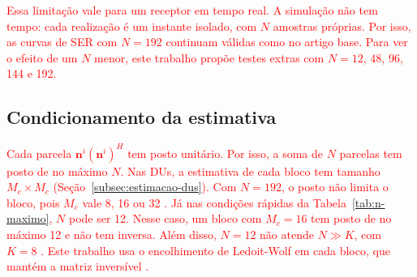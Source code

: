 \textcolor{red}{Essa limitação vale para um receptor em tempo real. A simulação não tem tempo: cada realização é um instante isolado, com $N$ amostras próprias. Por isso, as curvas de SER com $N = 192$ continuam válidas como no artigo base. Para ver o efeito de um $N$ menor, este trabalho propõe testes extras com $N = 12$, 48, 96, 144 e 192.}

\subsection{Condicionamento da estimativa}\label{subsec:condicionamento-R}

\textcolor{red}{Cada parcela $\mathbf{n}^i(\mathbf{n}^i)^H$ tem posto unitário. Por isso, a soma de $N$ parcelas tem posto de no máximo $N$. Nas DUs, a estimativa de cada bloco tem tamanho $M_c \times M_c$ (Seção~{\hypersetup{linkcolor=red}\ref{subsec:estimacao-dus}}). Com $N = 192$, o posto não limita o bloco, pois $M_c$ vale 8, 16 ou 32 \cite{zhao2025jsac}. Já nas condições rápidas da Tabela~{\hypersetup{linkcolor=red}\ref{tab:n-maximo}}, $N$ pode ser 12. Nesse caso, um bloco com $M_c = 16$ tem posto de no máximo 12 e não tem inversa. Além disso, $N = 12$ não atende $N \gg K$, com $K = 8$ \cite{zhao2025jsac}. Este trabalho usa o encolhimento de Ledoit-Wolf em cada bloco, que mantém a matriz inversível \cite{ledoit-wolf}.}

